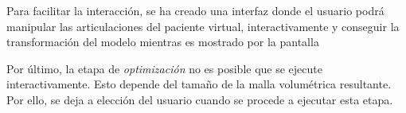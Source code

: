 Para facilitar la interacción, se ha creado una interfaz donde el usuario podrá manipular las articulaciones del paciente virtual, interactivamente y conseguir la transformación del modelo mientras es mostrado por la pantalla 

Por último, la etapa de \emph{optimización} no es posible que se ejecute interactivamente. Esto depende del tamaño de la malla volumétrica resultante. Por ello, se deja a elección del usuario cuando se procede a ejecutar esta etapa.


